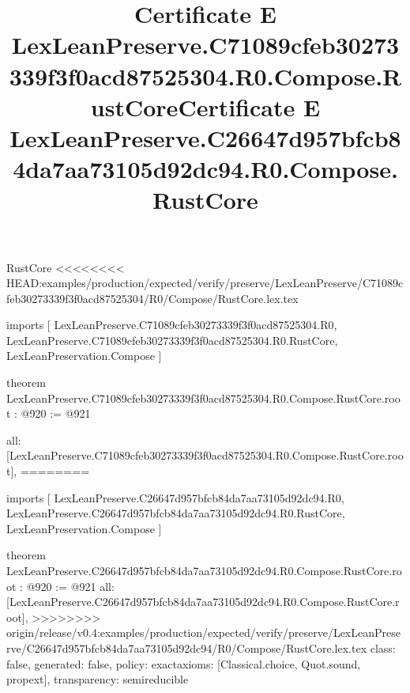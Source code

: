 \begin{lexlean}{RustCore}
<<<<<<<< HEAD:examples/production/expected/verify/preserve/LexLeanPreserve/C71089cfeb30273339f3f0acd87525304/R0/Compose/RustCore.lex.tex
\title{Certificate E LexLeanPreserve.C71089cfeb30273339f3f0acd87525304.R0.Compose.RustCore}
\begin{coremodule}
imports [
  LexLeanPreserve.C71089cfeb30273339f3f0acd87525304.R0,
  LexLeanPreserve.C71089cfeb30273339f3f0acd87525304.R0.RustCore,
  LexLeanPreservation.Compose
]

theorem LexLeanPreserve.C71089cfeb30273339f3f0acd87525304.R0.Compose.RustCore.root : @920 := @921 {
  all: [LexLeanPreserve.C71089cfeb30273339f3f0acd87525304.R0.Compose.RustCore.root],
========
\title{Certificate E LexLeanPreserve.C26647d957bfcb84da7aa73105d92dc94.R0.Compose.RustCore}
\begin{coremodule}
imports [
  LexLeanPreserve.C26647d957bfcb84da7aa73105d92dc94.R0,
  LexLeanPreserve.C26647d957bfcb84da7aa73105d92dc94.R0.RustCore,
  LexLeanPreservation.Compose
]

theorem LexLeanPreserve.C26647d957bfcb84da7aa73105d92dc94.R0.Compose.RustCore.root : @920 := @921 {
  all: [LexLeanPreserve.C26647d957bfcb84da7aa73105d92dc94.R0.Compose.RustCore.root],
>>>>>>>> origin/release/v0.4:examples/production/expected/verify/preserve/LexLeanPreserve/C26647d957bfcb84da7aa73105d92dc94/R0/Compose/RustCore.lex.tex
  class: false,
  generated: false,
  policy: exact{axioms: [Classical.choice, Quot.sound, propext]},
  transparency: semireducible
}


\end{coremodule}}
\end{coremodule}
\end{lexlean}
